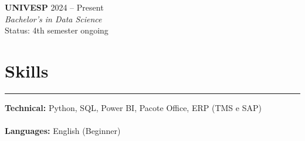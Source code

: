 \documentclass[11pt,a4paper]{article}
\begin{document}
    \noindent \textbf{UNIVESP} \hfill 2024 -- Present \\
    \textit{Bachelor's in Data Science} \\
    Status: 4th semester ongoing
    \vspace{2mm}

\vspace{5mm}
\section*{Skills}
\hrule
\vspace{3mm}
\noindent \textbf{Technical:} Python, SQL, Power BI, Pacote Office, ERP (TMS e SAP) \\
\vspace{1mm} \\
\textbf{Languages:} 
    English (Beginner)
\end{document}
